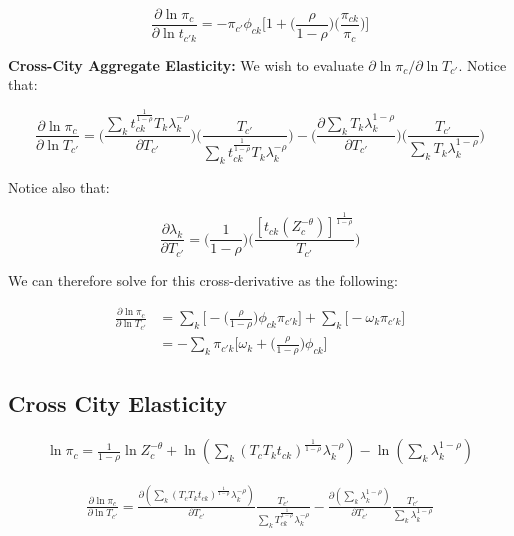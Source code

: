 \documentclass[10pt]{article}
\begin{document}
\begin{equation}
    \frac{\partial\ln{\pi_{c}}}{\partial\ln{t_{{c'}k}}} = -{\pi_{c'}}{\phi_{ck}}\Big[1+\Big(\frac{\rho}{1-\rho}\Big)\Big(\frac{\pi_{ck}}{\pi_{c}}\Big)\Big]
\end{equation}

\noindent\textbf{Cross-City Aggregate Elasticity:} We wish to evaluate $\partial\ln{\pi_{c}}/\partial\ln{T_{c'}}$. Notice that:

\begin{equation*}
    \frac{\partial\ln{\pi_{c}}}{\partial\ln{T_{c'}}} = \Bigg(\frac{\sum\limits_{k}{{t^{\frac{1}{1-\rho}}_{ck}}}{T_{k}}{\lambda^{-\rho}_{k}}}{\partial{T_{c'}}}\Bigg)\Bigg(\frac{T_{c'}}{\sum\limits_{k}t^{\frac{1}{1-\rho}}_{ck}{T_{k}}{\lambda^{-\rho}_{k}}}\Bigg) - \Bigg(\frac{\partial\sum\limits_{k}{T_{k}}\lambda^{1-\rho}_{k}}{\partial{T_{c'}}}\Bigg)\Bigg(\frac{T_{c'}}{\sum\limits_{k}{T_{k}}{\lambda_{k}^{1-\rho}}}\Bigg)
\end{equation*}

Notice also that:

\begin{equation*}
    \frac{\partial\lambda_{k}}{\partial{T_{c'}}} = \Bigg(\frac{1}{1-\rho}\Bigg)\Bigg(\frac{[t_{ck}(Z_{c}^{-\theta})]^{\frac{1}{1-\rho}}}{T_{c'}}\Bigg)
\end{equation*}

We can therefore solve for this cross-derivative as the following:

\begin{align*}
    \frac{\partial\ln{\pi_{c}}}{\partial\ln{T_{c'}}} & = \sum\limits_{k}\Big[-\Big(\frac{\rho}{1-\rho}\Big)\phi_{ck}{\pi_{{c'}k}}\Big]+\sum\limits_{k}\Big[-\omega_{k}\pi_{{c'}k}\Big] \\ &= -\sum\limits_{k}{\pi_{{c'}k}}\Big[\omega_{k}+\Big(\frac{\rho}{1-\rho}\Big)\phi_{ck}\Big]
\end{align*}

\subsection{Cross City Elasticity}

\begin{align*}
    \ln \pi_c = \frac{1}{1 - \rho} \ln Z_c^{- \theta} + \ln \left( \sum_{k}^{} (T_c T_k t_{ck})^{\frac{1}{1 - \rho}} \lambda_k^{- \rho} \right) - \ln \left( \sum_{k}^{} \lambda_k^{1 - \rho} \right)
\end{align*}

\begin{align*}
    \frac{\partial \ln \pi_c}{\partial \ln T_{c'}} = \frac{\partial \left( \sum_{k}^{} (T_c T_k t_{ck})^{\frac{1}{1 - \rho}} \lambda_k^{- \rho} \right)}{\partial T_{c'}} \frac{T_{c'}}{\sum_{k}^{} T_{ck}^{\frac{1}{1 - \rho}} \lambda_k^{- \rho}} - \frac{\partial \left( \sum_{k}^{} \lambda_k^{1 - \rho} \right)}{\partial T_{c'}} \frac{T_{c'}}{\sum_{k}^{} \lambda_k^{1 - \rho}}
\end{align*}
\end{document}
